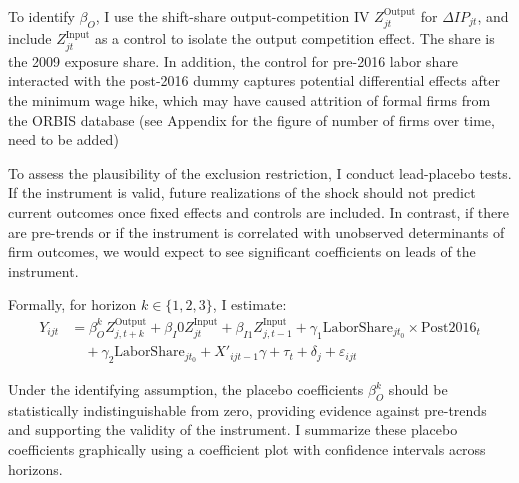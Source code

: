 \documentclass[12pt]{article}
\begin{document}
To identify $\beta_O$, I use the shift-share output-competition IV $Z_{jt}^{\text{Output}}$ for $\Delta IP_{jt}$, and include $Z_{jt}^{\text{Input}}$ as a control to isolate the output competition effect. The share is the 2009 exposure share. In addition, the control for pre-2016 labor share interacted with the post-2016 dummy captures potential differential effects after the minimum wage hike, which may have caused attrition of formal firms \parencite{akcigitFactsBusinessDynamism2020} from the ORBIS database (see Appendix for the figure of number of firms over time, need to be added)

To assess the plausibility of the exclusion restriction, I conduct lead-placebo tests. If the instrument is valid, future realizations of the shock should not predict current outcomes once fixed effects and controls are included. In contrast, if there are pre-trends or if the instrument is correlated with unobserved determinants of firm outcomes, we would expect to see significant coefficients on leads of the instrument.

Formally, for horizon $k \in \{1,2,3\}$, I estimate:
\begin{equation}
\begin{aligned}
Y_{ijt} &= \beta^{k}_O Z^{\text{Output}}_{j,t+k} + \beta_I0 Z_{jt}^{\text{Input}} + \beta_{I1} Z_{j,t-1}^{\text{Input}} + \gamma_1 \text{LaborShare}_{jt_0} \times \text{Post2016}_t \\
&\quad + \gamma_2 \text{LaborShare}_{jt_0} + X'_{ijt-1} \gamma + \tau_t + \delta_j + \varepsilon_{ijt}
\end{aligned}
\end{equation}

Under the identifying assumption, the placebo coefficients $\beta^{k}_O$ should be statistically indistinguishable from zero, providing evidence against pre-trends and supporting the validity of the instrument. I summarize these placebo coefficients graphically using a coefficient plot with confidence intervals across horizons.
\end{document}
